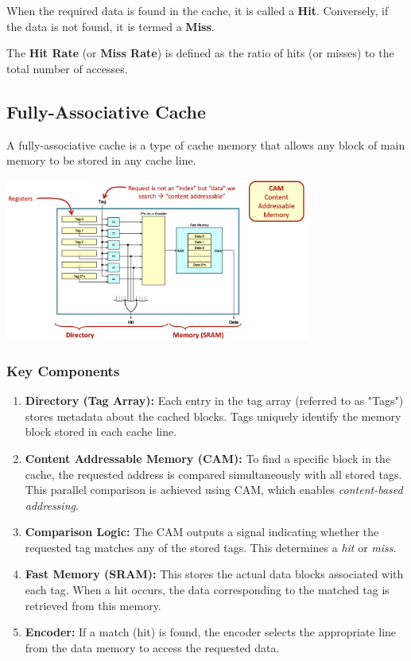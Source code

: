 When the required data is found in the cache, it is called a \textbf{Hit}. Conversely, if the data is not found, it is termed a \textbf{Miss}.

The \textbf{Hit Rate} (or \textbf{Miss Rate}) is defined as the ratio of hits (or misses) to the total number of accesses.


\subsection{Fully-Associative Cache}

A fully-associative cache is a type of cache memory that allows any block of main memory to be stored in any cache line. 

\begin{center}
    \includegraphics[width=0.75\textwidth]{chapters/chapter3a/images/cache3.png}
\end{center}
\subsubsection*{Key Components}
\begin{enumerate}
    \item \textbf{Directory (Tag Array):} Each entry in the tag array (referred to as "Tags") stores metadata about the cached blocks. Tags uniquely identify the memory block stored in each cache line.
    \item \textbf{Content Addressable Memory (CAM):} To find a specific block in the cache, the requested address is compared simultaneously with all stored tags. This parallel comparison is achieved using CAM, which enables \textit{content-based addressing}.
    \item \textbf{Comparison Logic:} The CAM outputs a signal indicating whether the requested tag matches any of the stored tags. This determines a \textit{hit} or \textit{miss}.
    \item \textbf{Fast Memory (SRAM):} This stores the actual data blocks associated with each tag. When a hit occurs, the data corresponding to the matched tag is retrieved from this memory.
    \item \textbf{Encoder:} If a match (hit) is found, the encoder selects the appropriate line from the data memory to access the requested data.
\end{enumerate}

